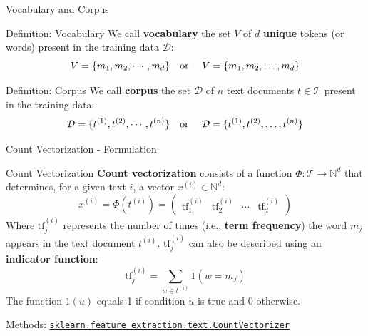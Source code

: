 \begin{frame}{Vocabulary and Corpus}
	\begin{block}{Definition: Vocabulary}
		We call \textbf{vocabulary} the set $V$ of $d$ \textbf{unique} tokens (or words) present in the training data $\mathcal{D}$:
		\begin{equation}
			V = \{m_1, m_2, \cdots, m_d\}
			\text{\quad or \quad} V = \{m_1, m_2, \dots, m_d\}
			\nonumber
		\end{equation}
	\end{block}
	\pause
	\begin{block}{Definition: Corpus}
		We call \textbf{corpus} the set $\mathcal{D}$ of $n$ text documents $t \in \mathcal{T}$ present in the training data:
		\begin{equation}
			\mathcal{D} = \{t^{(1)}, t^{(2)}, \cdots, t^{(n)}\}
			\text{\quad or \quad} \mathcal{D} = \{t^{(1)}, t^{(2)}, \dots, t^{(n)}\}
			\nonumber
		\end{equation}
	\end{block}	
\end{frame}

\begin{frame}{Count Vectorization - Formulation}
	\begin{block}{Count Vectorization}
		\textbf{Count vectorization} consists of a function $\Phi: \mathcal{T} \to \mathbb{N}^d$ that determines, for a given text $i$, a vector $x^{(i)} \in \mathbb{N}^d$:
		\begin{equation}
			x^{(i)} = \Phi(t^{(i)}) = \begin{pmatrix}
				\text{tf}^{(i)}_1 &	\text{tf}^{(i)}_2 &	\cdots & \text{tf}^{(i)}_d
			\end{pmatrix}
			\nonumber
		\end{equation}
		Where $\text{tf}^{(i)}_j$ represents the number of times (i.e., \textbf{term frequency}) the word $m_j$ appears in the text document $t^{(i)}$. $\text{tf}^{(i)}_j$ can also be described using an \textbf{indicator function}:
		\begin{equation}
			\text{tf}^{(i)}_j = \underset{w \in t^{(i)}}{\sum} 1(w = m_j)
			\nonumber
		\end{equation}
		The function $1(u)$ equals 1 if condition $u$ is true and 0 otherwise.
	\end{block}
	\vfill
	Methods: \href{https://scikit-learn.org/stable/modules/generated/sklearn.feature_extraction.text.CountVectorizer.html}{\texttt{sklearn.feature\_extraction.text.CountVectorizer}}
\end{frame}

